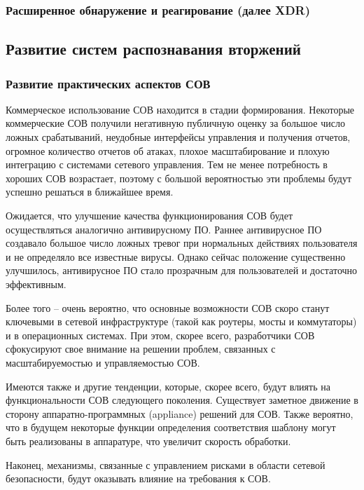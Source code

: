 \subsubsection{Расширенное обнаружение и реагирование (далее XDR)}




\subsection{Развитие систем распознавания вторжений}

\subsubsection{Развитие практических аспектов СОВ}

Коммерческое использование СОВ находится в стадии формирования. Некоторые коммерческие
СОВ получили негативную публичную оценку за большое число ложных срабатываний, неудобные
интерфейсы управления и получения отчетов, огромное количество отчетов об атаках,
плохое масштабирование и плохую интеграцию с системами сетевого управления. Тем не менее
потребность в хороших СОВ возрастает, поэтому с большой вероятностью эти проблемы будут
успешно решаться в ближайшее время.

Ожидается, что улучшение качества функционирования СОВ будет осуществляться аналогично
антивирусному ПО. Раннее антивирусное ПО создавало большое число ложных тревог при
нормальных действиях пользователя и не определяло все известные вирусы. Однако сейчас
положение существенно улучшилось, антивирусное ПО стало прозрачным для пользователей
и достаточно эффективным.

Более того – очень вероятно, что основные возможности СОВ скоро станут ключевыми в
сетевой инфраструктуре (такой как роутеры, мосты и коммутаторы) и в операционных системах.
При этом, скорее всего, разработчики СОВ сфокусируют свое внимание на решении проблем,
связанных с масштабируемостью и управляемостью СОВ.

Имеются также и другие тенденции, которые, скорее всего, будут влиять на функциональности
СОВ следующего поколения. Существует заметное движение в сторону аппаратно-программных
(appliance) решений для СОВ. Также вероятно, что в будущем некоторые функции определения
соответствия шаблону могут быть реализованы в аппаратуре, что увеличит скорость обработки.

Наконец, механизмы, связанные с управлением рисками в области сетевой безопасности,
будут оказывать влияние на требования к СОВ.




